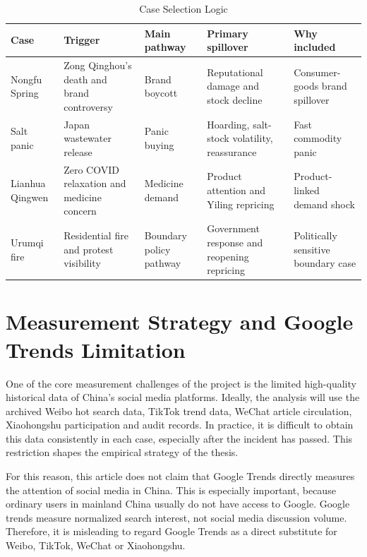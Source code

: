 \documentclass[conference]{IEEEtran}
\begin{document}
\begin{table}[t]
\centering
\caption{Case Selection Logic}
\label{tab:case_selection}
{\footnotesize
\setlength{\tabcolsep}{4pt}
\begin{tabular}{p{}p{}p{}p{}p{}}
\toprule
Case & Trigger & Main pathway & Primary spillover & Why included \\
\midrule
Nongfu Spring & Zong Qinghou's death and brand controversy & Brand boycott & Reputational damage and stock decline & Consumer-goods brand spillover \\
Salt panic & Japan wastewater release & Panic buying & Hoarding, salt-stock volatility, reassurance & Fast commodity panic \\
Lianhua Qingwen & Zero COVID relaxation and medicine concern & Medicine demand & Product attention and Yiling repricing & Product-linked demand shock \\
Urumqi fire & Residential fire and protest visibility & Boundary policy pathway & Government response and reopening repricing & Politically sensitive boundary case \\
\bottomrule
\end{tabular}
}
\end{table}

\section{Measurement Strategy and Google Trends Limitation}
One of the core measurement challenges of the project is the limited high-quality historical data of China's social media platforms. Ideally, the analysis will use the archived Weibo hot search data, TikTok trend data, WeChat article circulation, Xiaohongshu participation and audit records. In practice, it is difficult to obtain this data consistently in each case, especially after the incident has passed. This restriction shapes the empirical strategy of the thesis.

For this reason, this article does not claim that Google Trends directly measures the attention of social media in China. This is especially important, because ordinary users in mainland China usually do not have access to Google. Google trends measure normalized search interest, not social media discussion volume\cite{googlechina2010,googlechina2012,googletrendsfaq}.
Therefore, it is misleading to regard Google Trends as a direct substitute for Weibo, TikTok, WeChat or Xiaohongshu.
\end{document}

